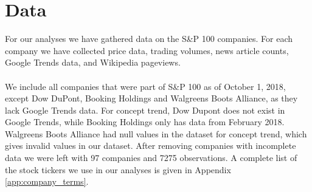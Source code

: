 
\chapter{Data}
For our analyses we have gathered data on the  S\&P 100 companies. For each company we have collected price data, trading volumes, news article counts, Google Trends data, and Wikipedia pageviews.  
\\\\
We include all companies that were part of S\&P 100 as of October 1, 2018, except Dow DuPont, Booking Holdings and Walgreens Boots Alliance, as they lack Google Trends data. For concept trend, Dow Dupont does not exist in Google Trends, while Booking Holdings only has data from February 2018. Walgreens Boots Alliance had null values in the dataset for concept trend, which gives invalid values in our dataset. After removing companies with incomplete data we were left with 97 companies and 7275 observations. A complete list of the stock tickers we use in our analyses is given in Appendix \ref{app:company_terms}.


